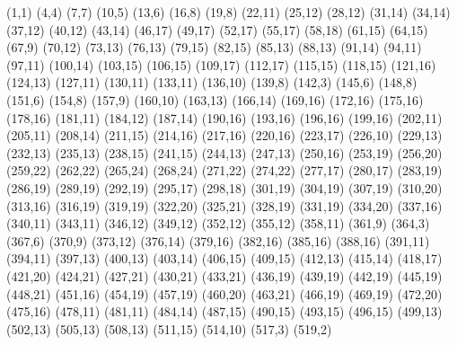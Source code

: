 (1,1) (4,4) (7,7) (10,5) (13,6) (16,8) (19,8) (22,11) (25,12) (28,12) (31,14) (34,14) (37,12) (40,12) (43,14) (46,17) (49,17) (52,17) (55,17) (58,18) (61,15) (64,15) (67,9) (70,12) (73,13) (76,13) (79,15) (82,15) (85,13) (88,13) (91,14) (94,11) (97,11) (100,14) (103,15) (106,15) (109,17) (112,17) (115,15) (118,15) (121,16) (124,13) (127,11) (130,11) (133,11) (136,10) (139,8) (142,3) (145,6) (148,8) (151,6) (154,8) (157,9) (160,10) (163,13) (166,14) (169,16) (172,16) (175,16) (178,16) (181,11) (184,12) (187,14) (190,16) (193,16) (196,16) (199,16) (202,11) (205,11) (208,14) (211,15) (214,16) (217,16) (220,16) (223,17) (226,10) (229,13) (232,13) (235,13) (238,15) (241,15) (244,13) (247,13) (250,16) (253,19) (256,20) (259,22) (262,22) (265,24) (268,24) (271,22) (274,22) (277,17) (280,17) (283,19) (286,19) (289,19) (292,19) (295,17) (298,18) (301,19) (304,19) (307,19) (310,20) (313,16) (316,19) (319,19) (322,20) (325,21) (328,19) (331,19) (334,20) (337,16) (340,11) (343,11) (346,12) (349,12) (352,12) (355,12) (358,11) (361,9) (364,3) (367,6) (370,9) (373,12) (376,14) (379,16) (382,16) (385,16) (388,16) (391,11) (394,11) (397,13) (400,13) (403,14) (406,15) (409,15) (412,13) (415,14) (418,17) (421,20) (424,21) (427,21) (430,21) (433,21) (436,19) (439,19) (442,19) (445,19) (448,21) (451,16) (454,19) (457,19) (460,20) (463,21) (466,19) (469,19) (472,20) (475,16) (478,11) (481,11) (484,14) (487,15) (490,15) (493,15) (496,15) (499,13) (502,13) (505,13) (508,13) (511,15) (514,10) (517,3) (519,2)